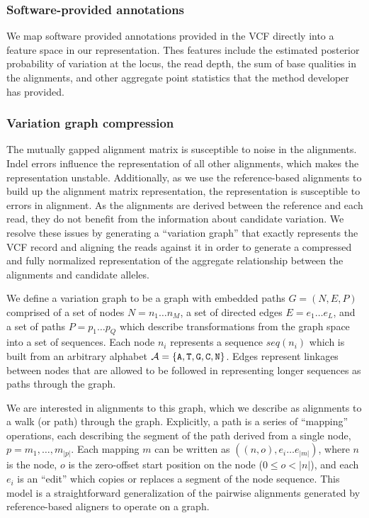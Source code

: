 \documentclass{article}
\begin{document}
\subsubsection{Software-provided annotations}


We map software provided annotations provided in the VCF directly into a feature space in our representation.
Thes features include the estimated posterior probability of variation at the locus, the read depth, the sum of base qualities in the alignments, and other aggregate point statistics that the method developer has provided.

\subsubsection{Variation graph compression}


The mutually gapped alignment matrix is susceptible to noise in the alignments.
Indel errors influence the representation of all other alignments, which makes the representation unstable.
Additionally, as we use the reference-based alignments to build up the alignment matrix representation, the representation is susceptible to errors in alignment.
As the alignments are derived between the reference and each read, they do not benefit from the information about candidate variation.
We resolve these issues by generating a ``variation graph'' that exactly represents the VCF record and aligning the reads against it in order to generate a compressed and fully normalized representation of the aggregate relationship between the alignments and candidate alleles.

We define a variation graph to be a graph with embedded paths $G = ( N, E, P )$ comprised of
a set of nodes $N = n_1 \ldots n_M$,
a set of directed edges $E = e_1 \ldots e_L$,
and a set of paths $P = p_1 \ldots p_Q$ which describe transformations from the graph space into a set of sequences.
Each node $n_i$ represents a sequence $seq(n_i)$ which is built from an arbitrary alphabet ${ \cal A } = \{ {\tt A, T, G, C, N} \}$.
Edges represent linkages between nodes that are allowed to be followed in representing longer sequences as paths through the graph.

We are interested in alignments to this graph, which we describe as alignments to a walk (or path) through the graph.
Explicitly, a path is a series of ``mapping'' operations, each describing the segment of the path derived from a single node, $p = m_1, \ldots, m_{|p|}$.
Each mapping $m$ can be written as $( (n, o), e_i \ldots e_{|m|} )$, where $n$ is the node, $o$ is the zero-offset start position on the node ($0 \le o < |n|$), and each $e_i$ is an ``edit'' which copies or replaces a segment of the node sequence.
This model is a straightforward generalization of the pairwise alignments generated by reference-based aligners to operate on a graph.
\end{document}
